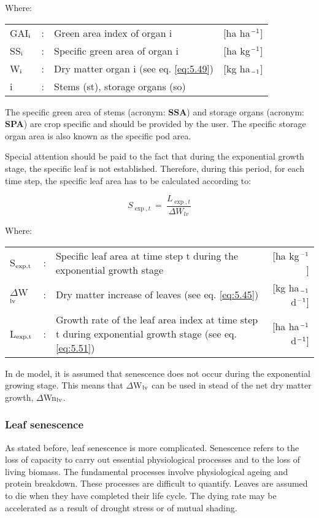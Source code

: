 Where:\\[5pt]
\begin{tabularx}{\textwidth}{llXr}
GAI$_{{\rm i}}$ &:& Green area index of organ i    &
    [ha ha$^{{\rm -1}}$]\\
SS$_{{\rm i}}$ &:& Specific green area of organ i    &
    [ha kg$^{{\rm -1}}$]\\
W$_{{\rm i}}$ &:& Dry matter organ i (see eq. \ref{eq:5.49})    &
    [kg ha$_{{\rm -1}}$]\\
i &:& Stems (st), storage organs (so)\\
\end{tabularx}

The specific green area of stems (acronym: {\bf SSA}) and storage organs (acronym: {\bf SPA}) are
crop specific and should be provided by the user. The specific storage organ area is also
known as the specific pod area.

Special attention should be paid to the fact that during the exponential growth stage, the
specific leaf is not established. Therefore, during this period, for each time step, the
specific leaf area has to be calculated according to:

\begin{equation}
S_{\exp,t} ~=~ {\frac{L_{\exp,t}}{\Delta W_{lv} }}
\end{equation}

Where:\\[5pt]
\begin{tabularx}{\textwidth}{llXr}
S$_{{\rm exp,t}}$ &:& Specific leaf area at time step t during the 
    exponential growth stage    &     [ha kg$^{{\rm -1}}$]\\
$\Delta$W$_{{\rm lv}}$ &:& Dry matter increase of leaves (see eq. \ref{eq:5.45})   &
    [kg ha$_{{\rm -1}}$ d$^{{\rm -1}}$]\\
L$_{{\rm \exp,t}}$ &:& Growth rate of the leaf area index at time step t
   during exponential growth stage (see eq. \ref{eq:5.51})   &
        [ha ha$^{{\rm -1}}$ d$^{{\rm -1}}$]\\
\end{tabularx}

 
In de model, it is assumed that senescence does not occur during the exponential growing
stage. This means that $\Delta$W$_{{\rm lv}}$ can be used in stead of the net dry matter growth, $\Delta$Wn$_{{\rm lv}}$.

\subsubsection{Leaf senescence}
As stated before, leaf senescence is more complicated. Senescence refers to the loss of
capacity to carry out essential physiological processes and to the loss of living biomass.
The fundamental processes involve physiological ageing and protein breakdown. These
processes are difficult to quantify. Leaves are assumed to die when they have completed
their life cycle. The dying rate may be accelerated as a result of drought stress or of
mutual shading.

